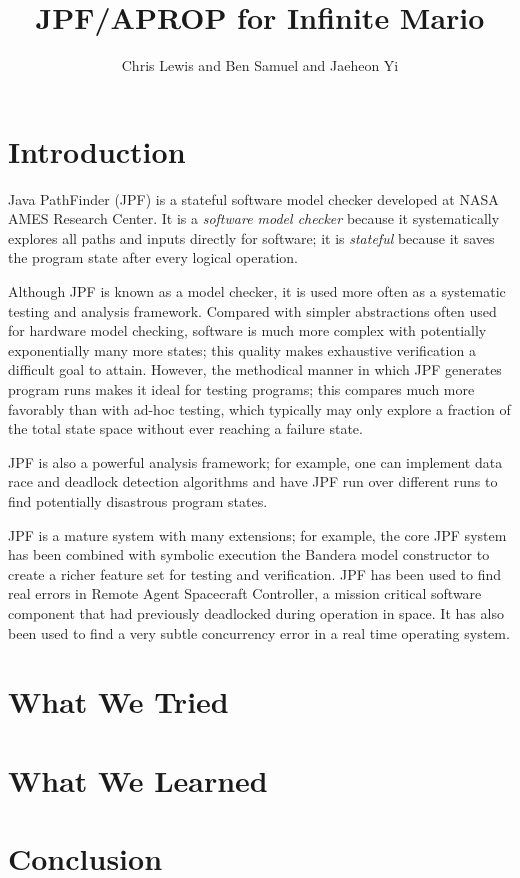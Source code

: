 \documentclass{article}
\title{JPF/APROP for Infinite Mario}
\author{Chris Lewis and Ben Samuel and Jaeheon Yi}
\begin{document}
\maketitle

\section{Introduction}
Java PathFinder (JPF) is a stateful software model checker developed at NASA AMES Research Center. 
It is a \emph{software model checker} because it systematically explores all paths and inputs directly for software;
it is \emph{stateful} because it saves the program state after every logical operation. 

Although JPF is known as a model checker, it is used more often as a systematic testing and analysis framework. 
Compared with simpler abstractions often used for hardware model checking, software is much more complex with potentially exponentially many more states;
this quality makes exhaustive verification a difficult goal to attain. 
However, the methodical manner in which JPF generates program runs makes it ideal for testing programs; 
this compares much more favorably than with ad-hoc testing, which typically may only explore a fraction of the total state space without ever reaching a failure state. 

JPF is also a powerful analysis framework; for example, one can implement data race and deadlock detection algorithms and have JPF run over different runs to find potentially disastrous program states. 

JPF is a mature system with many extensions; for example, the core JPF system has been combined with symbolic execution the Bandera model constructor to create a richer feature set for testing and verification. 
JPF has been used to find real errors in Remote Agent Spacecraft Controller, a mission critical software component that had previously deadlocked during operation in space. 
It has also been used to find a very subtle concurrency error in a real time operating system. 



\section{What We Tried}

\section{What We Learned}

\section{Conclusion}
\end{document}
